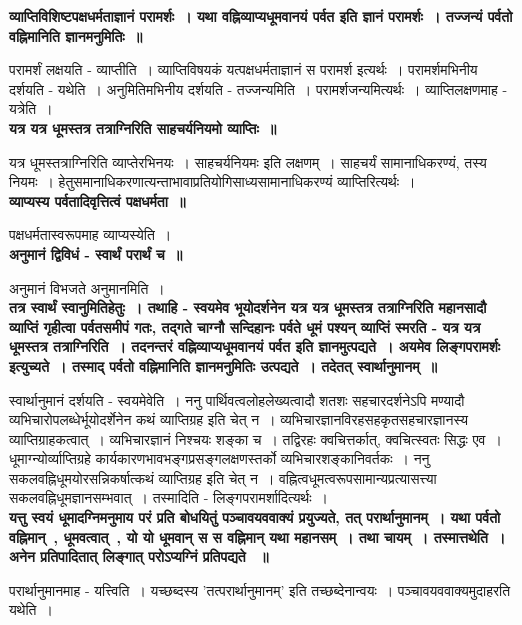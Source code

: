 {\bfseries व्याप्तिविशिष्टपक्षधर्मताज्ञानं परामर्शः~। यथा वह्निव्याप्यधूमवानयं पर्वत इति ज्ञानं परामर्शः~। तज्जन्यं पर्वतो वह्निमानिति ज्ञानमनुमितिः~॥}\par
	परामर्शं लक्षयति - व्याप्तीति~। व्याप्तिविषयकं यत्पक्षधर्मताज्ञानं स परामर्श इत्यर्थः~। परामर्शमभिनीय दर्शयति - यथेति~। अनुमितिमभिनीय दर्शयति - तज्जन्यमिति~। परामर्शजन्यमित्यर्थः~। व्याप्तिलक्षणमाह - यत्रेति~।\\[10pt]
{\bfseries यत्र यत्र धूमस्तत्र तत्राग्निरिति साहचर्यनियमो व्याप्तिः~॥}\par
	यत्र धूमस्तत्राग्निरिति व्याप्तेरभिनयः~। साहचर्यनियमः इति लक्षणम्~। साहचर्यं सामानाधिकरण्यं, तस्य नियमः~। हेतुसमानाधिकरणात्यन्ताभावाप्रतियोगिसाध्यसामानाधिकरण्यं व्याप्तिरित्यर्थः~।\\[10pt]
\noindent
{\bfseries व्याप्यस्य पर्वतादिवृत्तित्वं पक्षधर्मता~॥}\par
	पक्षधर्मतास्वरूपमाह व्याप्यस्येति~।\\[10pt]
{\bfseries अनुमानं द्विविधं - स्वार्थं परार्थं च~॥}\par
	अनुमानं विभजते अनुमानमिति~।\\[10pt]
{\bfseries तत्र स्वार्थं स्वानुमितिहेतुः~। तथाहि - स्वयमेव भूयोदर्शनेन यत्र यत्र धूमस्तत्र तत्राग्निरिति महानसादौ व्याप्तिं गृहीत्वा पर्वतसमीपं गतः, तद्गते चाग्नौ सन्दिहानः पर्वते धूमं पश्यन् व्याप्तिं स्मरति - यत्र यत्र धूमस्तत्र तत्राग्निरिति~। तदनन्तरं वह्निव्याप्यधूमवानयं पर्वत इति ज्ञानमुत्पद्यते~। अयमेव लिङ्गपरामर्शः इत्युच्यते~। तस्माद् पर्वतो वह्निमानिति ज्ञानमनुमितिः उत्पद्यते~। तदेतत् स्वार्थानुमानम्~॥}\par
	स्वार्थानुमानं दर्शयति - स्वयमेवेति~। ननु पार्थिवत्वलोहलेख्यत्वादौ शतशः सहचारदर्शनेऽपि मण्यादौ व्यभिचारोपलब्धेर्भूयोदर्शेनेन कथं व्याप्तिग्रह इति चेत् न~। व्यभिचारज्ञानविरहसहकृतसहचारज्ञानस्य व्याप्तिग्राहकत्वात्~। व्यभिचारज्ञानं निश्चयः शङ्का च~। तद्विरहः क्वचित्तर्कात्, क्वचित्स्वतः सिद्धः एव~। धूमाग्न्योर्व्याप्तिग्रहे कार्यकारणभावभङ्गप्रसङ्गलक्षणस्तर्को व्यभिचारशङ्कानिवर्तकः~। ननु सकलवह्निधूमयोरसन्निकर्षात्कथं व्याप्तिग्रह इति चेत् न~। वह्नित्वधूमत्वरूपसामान्यप्रत्यासत्त्या सकलवह्निधूमज्ञानसम्भवात्~। तस्मादिति - लिङ्गपरामर्शादित्यर्थः~।\\[10pt]
{\bfseries यत्तु स्वयं धूमादग्निमनुमाय परं प्रति बोधयितुं पञ्चावयववाक्यं प्रयुज्यते, तत् परार्थानुमानम्~। यथा पर्वतो वह्निमान्~, धूमवत्वात्~, यो यो धूमवान् स स वह्निमान् यथा महानसम्~। तथा चायम्~। तस्मात्तथेति~। अनेन प्रतिपादितात् लिङ्गात् परोऽप्यग्निं प्रतिपद्यते ~॥}\par
	परार्थानुमानमाह - यत्त्विति~। यच्छब्दस्य ’तत्परार्थानुमानम्’ इति तच्छब्देनान्वयः~। पञ्चावयववाक्यमुदाहरति यथेति~।\\[10pt]
